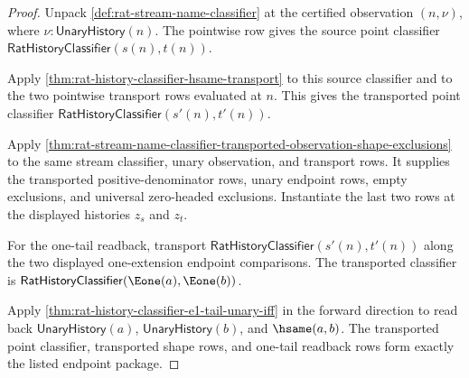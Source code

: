 \begin{proof}
Unpack \autoref{def:rat-stream-name-classifier} at the certified observation
$(n,\nu)$, where $\nu:\mathsf{UnaryHistory}(n)$. The pointwise row gives the
source point classifier $\mathsf{RatHistoryClassifier}(s(n),t(n))$.

Apply \autoref{thm:rat-history-classifier-hsame-transport} to this source
classifier and to the two pointwise transport rows evaluated at $n$. This gives
the transported point classifier
$\mathsf{RatHistoryClassifier}(s'(n),t'(n))$.

Apply
\autoref{thm:rat-stream-name-classifier-transported-observation-shape-exclusions}
to the same stream classifier, unary observation, and transport rows. It
supplies the transported positive-denominator rows, unary endpoint rows, empty
exclusions, and universal zero-headed exclusions. Instantiate the last two rows
at the displayed histories $z_s$ and $z_t$.

For the one-tail readback, transport
$\mathsf{RatHistoryClassifier}(s'(n),t'(n))$ along the two displayed
one-extension endpoint comparisons. The transported classifier is
$\mathsf{RatHistoryClassifier}(\Eone(a),\Eone(b))$.

Apply \autoref{thm:rat-history-classifier-e1-tail-unary-iff} in the forward
direction to read back $\mathsf{UnaryHistory}(a)$,
$\mathsf{UnaryHistory}(b)$, and $\hsame(a,b)$. The transported point
classifier, transported shape rows, and one-tail readback rows form exactly the
listed endpoint package.
\end{proof}

